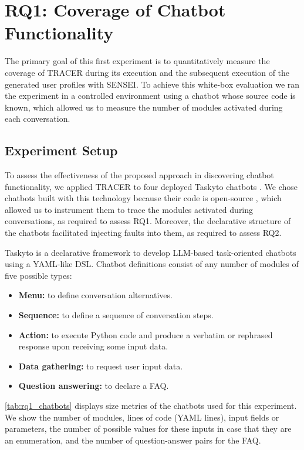 \section{RQ1: Coverage of Chatbot Functionality}

The primary goal of this first experiment
is to quantitatively measure the coverage
of \ac{TRACER} during its execution and
the subsequent execution of the generated user profiles with SENSEI.
To achieve this white-box evaluation
we ran the experiment in a controlled environment
using a chatbot whose source code is known,
which allowed us to measure the number of modules activated
during each conversation.

\subsection{Experiment Setup}

To assess the effectiveness of the proposed approach in discovering chatbot functionality,
we applied \ac{TRACER} to four deployed Taskyto chatbots
\autocite{sanchezcuadradoAutomatingDevelopmentTaskoriented2024}.
We chose chatbots built with this technology because their code is open-source
\autocite{SatorichatbotsTaskyto2025},
which allowed us to instrument them
to trace the modules activated during conversations,
as required to assess RQ1.
Moreover, the declarative structure of the chatbots
facilitated injecting faults into them, as required to assess RQ2.

Taskyto is a declarative framework
to develop LLM-based task-oriented chatbots using a YAML-like DSL.
Chatbot definitions consist of any number of modules of five possible types:

\begin{itemize}
  \item 
    \textbf{Menu:} to define conversation alternatives.
\item
  \textbf{Sequence:} to define a sequence of conversation steps.
\item
  \textbf{Action:} to execute Python code and produce a
verbatim or rephrased response upon receiving some input data.
\item
  \textbf{Data gathering:} to request user input data.
\item
  \textbf{Question answering:} to declare a FAQ.
\end{itemize}


\autoref{tab:rq1_chatbots} displays size metrics
of the chatbots used for this experiment.
We show the number of modules, lines of code (YAML lines),
input fields or parameters,
the number of possible values for these inputs in case that they are an enumeration,
and the number of question-answer pairs for the FAQ.

